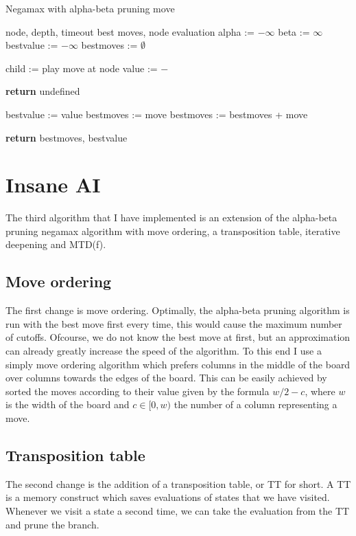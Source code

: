 \documentclass[a4paper]{article}
\begin{document}
\begin{algorithm}
	\caption{Negamax with alpha-beta pruning move}
	\label{alg: alpha beta move}
	\begin{algorithmic}[1]
		\Require node, depth, timeout
		\Ensure best moves, node evaluation
			\State alpha := $-\infty$
			\State beta := $\infty$
			\State bestvalue := $-\infty$
			\State bestmoves := $\emptyset$

				\State child := play move at node
				\State value := $-$

					\State \textbf{return} undefined
				\EndIf

					\State bestvalue := value
					\State bestmoves := move
					\State bestmoves := bestmoves + move
				\EndIf
			\EndFor

			\State \textbf{return} bestmoves, bestvalue
		\EndFunction
	\end{algorithmic}
\end{algorithm}

\section{Insane AI}

The third algorithm that I have implemented is an extension of the alpha-beta
pruning negamax algorithm with move ordering, a transposition table, iterative
deepening and MTD(f).

\subsection{Move ordering}
The first change is move ordering. Optimally, the alpha-beta pruning algorithm
is run with the best move first every time, this would cause the maximum number
of cutoffs. Ofcourse, we do not know the best move at first, but an
approximation can already greatly increase the speed of the algorithm. To this
end I use a simply move ordering algorithm which prefers columns in the middle
of the board over columns towards the edges of the board. This can be easily
achieved by sorted the moves according to their value given by the formula $w /
2 - c$, where $w$ is the width of the board and $c \in [0, w)$ the number of a
column representing a move.

\subsection{Transposition table}
The second change is the addition of a transposition table, or TT for short. A
TT is a memory construct which saves evaluations of states that we have
visited. Whenever we visit a state a second time, we can take the evaluation
from the TT and prune the branch.
\end{document}

